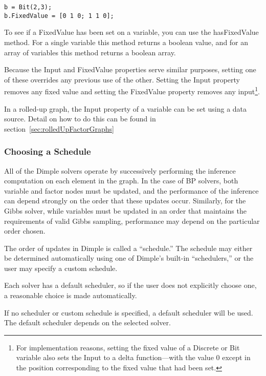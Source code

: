 \begin{lstlisting}
b = Bit(2,3);
b.FixedValue = [0 1 0; 1 1 0];
\end{lstlisting}

To see if a FixedValue has been set on a variable, you can use the hasFixedValue method.  For a single variable this method returns a boolean value, and for an array of variables this method returns a boolean array.

Because the Input and FixedValue properties serve similar purposes, setting one of these overrides any previous use of the other.  Setting the Input property removes any fixed value and setting the FixedValue property removes any input\footnote{For implementation reasons, setting the fixed value of a Discrete or Bit variable also sets the Input to a delta function---with the value 0 except in the position corresponding to the fixed value that had been set.}.



In a rolled-up graph, the Input property of a variable can be set using a data source.  Detail on how to do this can be found in section~\ref{sec:rolledUpFactorGraphs}



\subsubsection{Choosing a Schedule}

All of the Dimple solvers operate by successively performing the inference computation on each element in the graph.  In the case of BP solvers, both variable and factor nodes must be updated, and the performance of the inference can depend strongly on the order that these updates occur.  Similarly, for the Gibbs solver, while variables must be updated in an order that maintains the requirements of valid Gibbs sampling, performance may depend on the particular order chosen.

The order of updates in Dimple is called a ``schedule.''  The schedule may either be determined automatically using one of Dimple's built-in ``schedulers,'' or the user may specify a custom schedule.

Each solver has a default scheduler, so if the user does not explicitly choose one, a reasonable choice is made automatically.



If no scheduler or custom schedule is specified, a default scheduler will be used.  The default scheduler depends on the selected solver.

